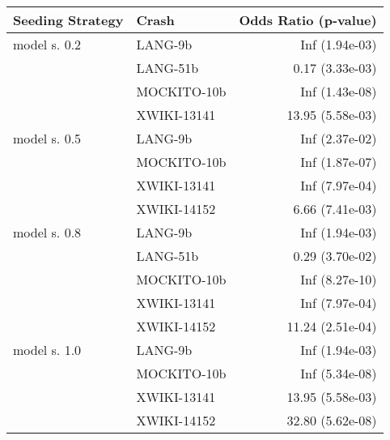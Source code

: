 \begin{tabular}{ l | l | r}
\hline 
\textbf{Seeding Strategy} & \textbf{Crash} & \textbf{Odds Ratio (p-value)} \\ 
\hline 
model s. 0.2 & LANG-9b & Inf (1.94e-03)\\ 
 & LANG-51b & 0.17 (3.33e-03)\\ 
 & MOCKITO-10b & Inf (1.43e-08)\\ 
 & XWIKI-13141 & 13.95 (5.58e-03)\\ 
\hline 
model s. 0.5 & LANG-9b & Inf (2.37e-02)\\ 
 & MOCKITO-10b & Inf (1.87e-07)\\ 
 & XWIKI-13141 & Inf (7.97e-04)\\ 
 & XWIKI-14152 & 6.66 (7.41e-03)\\ 
\hline 
model s. 0.8 & LANG-9b & Inf (1.94e-03)\\ 
 & LANG-51b & 0.29 (3.70e-02)\\ 
 & MOCKITO-10b & Inf (8.27e-10)\\ 
 & XWIKI-13141 & Inf (7.97e-04)\\ 
 & XWIKI-14152 & 11.24 (2.51e-04)\\ 
\hline 
model s. 1.0 & LANG-9b & Inf (1.94e-03)\\ 
 & MOCKITO-10b & Inf (5.34e-08)\\ 
 & XWIKI-13141 & 13.95 (5.58e-03)\\ 
 & XWIKI-14152 & 32.80 (5.62e-08)\\ 
\hline 
\end{tabular}